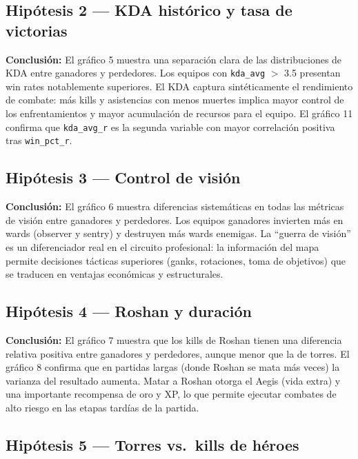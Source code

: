 \documentclass[12pt,a4paper]{article}
\begin{document}
\subsection*{Hip\'otesis 2 --- KDA hist\'orico y tasa de victorias}

\textbf{Conclusi\'on:} El gr\'afico 5 muestra una separaci\'on clara de las
distribuciones de KDA entre ganadores y perdedores. Los equipos con
\texttt{kda\_avg} $>$ 3.5 presentan win rates notablemente superiores. El KDA
captura sint\'eticamente el rendimiento de combate: m\'as kills y asistencias con
menos muertes implica mayor control de los enfrentamientos y mayor acumulaci\'on
de recursos para el equipo. El gr\'afico 11 confirma que \texttt{kda\_avg\_r}
es la segunda variable con mayor correlaci\'on positiva tras \texttt{win\_pct\_r}.

\subsection*{Hip\'otesis 3 --- Control de visi\'on}

\textbf{Conclusi\'on:} El gr\'afico 6 muestra diferencias sistem\'aticas en todas
las m\'etricas de visi\'on entre ganadores y perdedores. Los equipos ganadores
invierten m\'as en wards (observer y sentry) y destruyen m\'as wards enemigas. La
``guerra de visi\'on'' es un diferenciador real en el circuito profesional: la
informaci\'on del mapa permite decisiones t\'acticas superiores (ganks, rotaciones,
toma de objetivos) que se traducen en ventajas econ\'omicas y estructurales.

\subsection*{Hip\'otesis 4 --- Roshan y duraci\'on}

\textbf{Conclusi\'on:} El gr\'afico 7 muestra que los kills de Roshan tienen una
diferencia relativa positiva entre ganadores y perdedores, aunque menor que la de
torres. El gr\'afico 8 confirma que en partidas largas (donde Roshan se mata m\'as
veces) la varianza del resultado aumenta. Matar a Roshan otorga el Aegis (vida
extra) y una importante recompensa de oro y XP, lo que permite ejecutar combates
de alto riesgo en las etapas tard\'ias de la partida.

\subsection*{Hip\'otesis 5 --- Torres vs.\ kills de h\'eroes}
\end{document}

